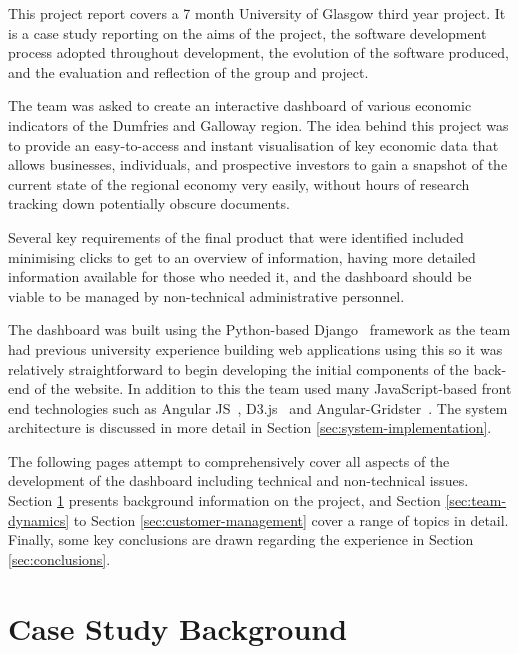\documentclass{l3proj}
\begin{document}
This project report covers a 7 month University of Glasgow third year project. It is a case study reporting on the aims of the project, the software development process adopted throughout development, the evolution of the software produced, and the evaluation and reflection of the group and project.

The team was asked to create an interactive dashboard of various economic indicators of the Dumfries and Galloway region. The idea behind this project was to provide an easy-to-access and instant visualisation of key economic data that allows businesses, individuals, and prospective investors to gain a snapshot of the current state of the regional economy very easily, without hours of research tracking down potentially obscure documents.

Several key requirements of the final product that were identified included minimising clicks to get to an overview of information, having more detailed information available for those who needed it, and the dashboard should be viable to be managed by non-technical administrative personnel.

The dashboard was built using the Python-based Django~\cite{Django} framework as the team had previous university experience building web applications using this so it was relatively straightforward to begin developing the initial components of the back-end of the website. In addition to this the team used many JavaScript-based front end technologies such as Angular JS~\cite{AngularWebpage}, D3.js~\cite{d3Webpage} and Angular-Gridster~\cite{AngularGridster}. The system architecture is discussed in more detail in Section \ref{sec:system-implementation}.

The following pages attempt to comprehensively cover all aspects of the development of the dashboard including technical and non-technical issues. Section \ref{sec:background} presents background information on the project, and Section \ref{sec:team-dynamics} to Section \ref{sec:customer-management} cover a range of topics in detail. Finally, some key conclusions are drawn regarding the experience in Section \ref{sec:conclusions}.

\section{Case Study Background}
\label{sec:background}
\end{document}

